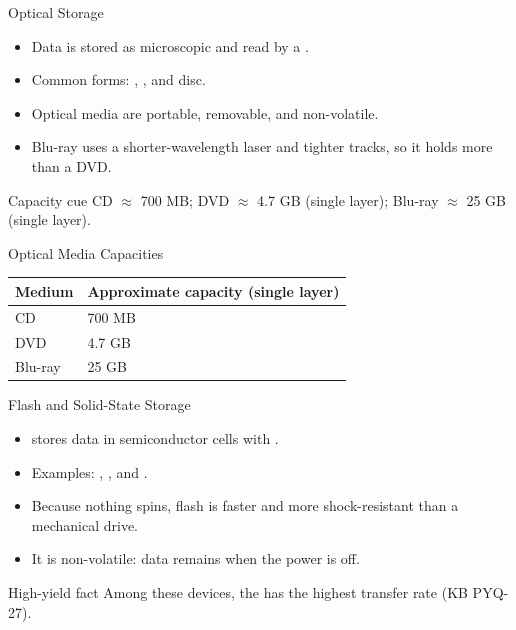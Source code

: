 \documentclass[aspectratio=169]{beamer}
\begin{document}
\begin{frame}{Optical Storage}
  \begin{itemize}
    \item Data is stored as microscopic  and read by a
      .
    \item Common forms: , , and  disc.
    \item Optical media are portable, removable, and non-volatile.
    \item Blu-ray uses a shorter-wavelength laser and tighter tracks, so it
      holds more than a DVD.
  \end{itemize}
  \begin{block}{Capacity cue}
    CD $\approx$ 700 MB; DVD $\approx$ 4.7 GB (single layer); Blu-ray
    $\approx$ 25 GB (single layer).
  \end{block}
\end{frame}

\begin{frame}{Optical Media Capacities}
  \begin{center}
    \begin{tabular}{ll}
      \toprule
      \textbf{Medium} & \textbf{Approximate capacity (single layer)} \\
      \midrule
      CD & 700 MB \\
      DVD & 4.7 GB \\
      Blu-ray & 25 GB \\
      \bottomrule
    \end{tabular}
  \end{center}
  \vspace{0.3cm}
\end{frame}

\begin{frame}{Flash and Solid-State Storage}
  \begin{itemize}
    \item {} stores data in semiconductor cells with
      .
    \item Examples: , , and .
    \item Because nothing spins, flash is faster and more shock-resistant
      than a mechanical drive.
    \item It is non-volatile: data remains when the power is off.
  \end{itemize}
  \begin{alertblock}{High-yield fact}
    Among these devices, the  has the highest transfer rate
    (KB PYQ-27).
  \end{alertblock}
\end{frame}
\end{document}
